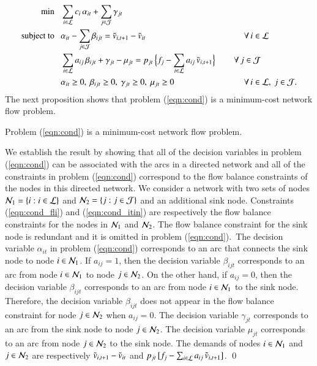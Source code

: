 %
%
\begin{subequations}
\label{eqn:cond}
\begin{align}
\min~~~ & \sum_{i \in {\cal L}} c_i {\,} \alpha_{it} + \sum_{j \in {\cal J}} \gamma_{jt}
\label{eqn:cond_obj}
\\
\mbox{subject to}~~~
&
\alpha_{it} 
- \sum_{j \in {\cal J}} \beta_{ijt}  = {\tilde v}_{i,t+1} - {\tilde v}_{it} 
\qquad \qquad \qquad  \qquad \qquad \quad {\,} {\,} {\,} {\,} \! \forall {\,} i \in {\cal L}
\label{eqn:cond_fli}
\\
& 
\sum_{i \in {\cal L}} a_{ij} {\,} \beta_{ijt} + \gamma_{jt} - \mu_{jt} = p_{jt} {\,} \Big\{ f_j - \sum_{i \in {\cal L}} a_{ij} {\,} {\tilde v}_{i,t+1} \Big\} \quad \quad {\,} \forall {\,} j \in {\cal J}
\label{eqn:cond_itin}
\\
& \alpha_{it} \geq 0,~ \beta_{ijt} \geq 0,~ \gamma_{jt} \geq 0,~ \mu_{jt} \geq 0
\qquad \qquad \qquad \qquad {\,} \forall {\,} i \in {\cal L},~ j \in {\cal J}.
\label{eqn:cond_e}
\end{align}
\end{subequations}
%
%
The next proposition shows that problem (\ref{eqn:cond}) is a minimum-cost network flow problem.

\begin{pros}
\label{pro:network}
Problem \textup{(\ref{eqn:cond})} is a minimum-cost network flow problem.
\end{pros}



We establish the result by showing that all of the decision variables in problem (\ref{eqn:cond}) can be associated with the arcs in a directed network and all of the constraints in problem (\ref{eqn:cond}) correspond to the flow balance constraints of the nodes in this directed network. We consider a network with two sets of nodes ${\cal N}_1  = \{ i : i \in {\cal L} \}$ and ${\cal N}_2 = \{ j : j \in {\cal J}\}$ and an additional sink node. Constraints (\ref{eqn:cond_fli}) and (\ref{eqn:cond_itin}) are respectively the flow balance constraints for the nodes in ${\cal N}_1$ and ${\cal N}_2$. The flow balance constraint for the sink node is redundant and it is omitted in problem (\ref{eqn:cond}).~The decision variable $\alpha_{it}$ in problem (\ref{eqn:cond}) corresponds to an arc that connects the sink node to node $i \in {\cal N}_1$. If $a_{ij} = 1$, then the decision variable $\beta_{ijt}$ corresponds to an arc from node $i \in {\cal N}_1$ to node $j \in {\cal N}_2$. On the other hand, if $a_{ij} = 0$, then the decision variable $\beta_{ijt}$ corresponds to an arc  from node $i \in {\cal N}_1$ to the sink node. Therefore, the decision variable $\beta_{ijt}$ does not appear in the flow balance constraint for node $j \in {\cal N}_2$ when $a_{ij}= 0$. The decision variable $\gamma_{jt}$ corresponds to an arc from the sink node to node $j \in {\cal N}_2$. The decision variable $\mu_{jt}$ corresponds to an arc from node $j \in {\cal N}_2$ to the sink node. The demands of nodes $i \in {\cal N}_1$ and $j \in {\cal N}_2$ are respectively ${\tilde v}_{i,t+1} - {\tilde v}_{it}$ and  $p_{jt} {\,} [ f_j - \sum_{i \in {\cal L}} a_{ij} {\,} {\tilde v}_{i,t+1}]$. \qed

